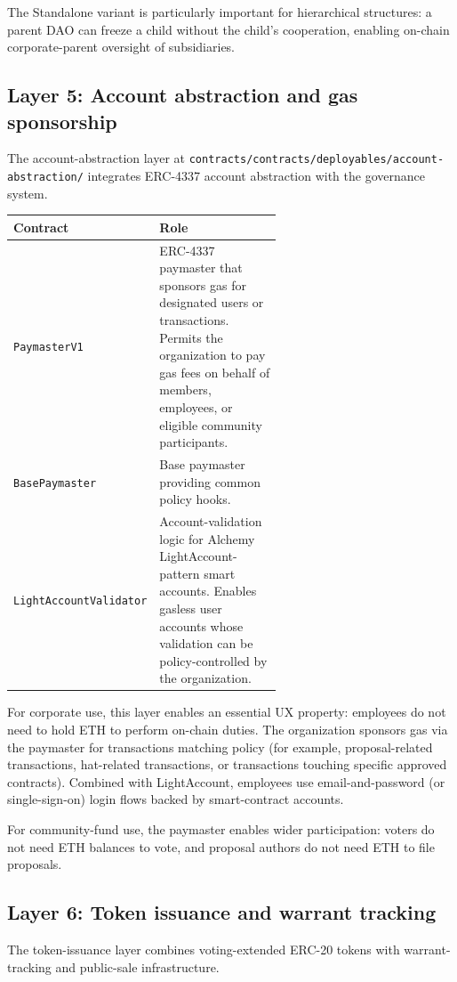 \documentclass[11pt,letterpaper]{article}
\begin{document}
The Standalone variant is particularly important for hierarchical structures: a parent DAO can freeze a child without the child's cooperation, enabling on-chain corporate-parent oversight of subsidiaries.

\subsection{Layer 5: Account abstraction and gas sponsorship}

The account-abstraction layer at \texttt{contracts/contracts/deployables/account-abstraction/} integrates ERC-4337 account abstraction with the governance system.

\begin{longtable}{lp{0.6\linewidth}}
\toprule
\textbf{Contract} & \textbf{Role} \\
\midrule
\texttt{PaymasterV1} & ERC-4337 paymaster that sponsors gas for designated users or transactions. Permits the organization to pay gas fees on behalf of members, employees, or eligible community participants. \\
\texttt{BasePaymaster} & Base paymaster providing common policy hooks. \\
\texttt{LightAccountValidator} & Account-validation logic for Alchemy LightAccount-pattern smart accounts. Enables gasless user accounts whose validation can be policy-controlled by the organization. \\
\bottomrule
\end{longtable}

For corporate use, this layer enables an essential UX property: employees do not need to hold ETH to perform on-chain duties. The organization sponsors gas via the paymaster for transactions matching policy (for example, proposal-related transactions, hat-related transactions, or transactions touching specific approved contracts). Combined with LightAccount, employees use email-and-password (or single-sign-on) login flows backed by smart-contract accounts.

For community-fund use, the paymaster enables wider participation: voters do not need ETH balances to vote, and proposal authors do not need ETH to file proposals.

\subsection{Layer 6: Token issuance and warrant tracking}

The token-issuance layer combines voting-extended ERC-20 tokens with warrant-tracking and public-sale infrastructure.
\end{document}
